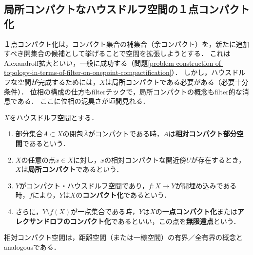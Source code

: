 \documentclass[uplatex,dvipdfmx]{jsreport}
\begin{document}
\subsection{局所コンパクトなハウスドルフ空間の１点コンパクト化}

\begin{tcolorbox}[colframe=ForestGreen, colback=ForestGreen!10!white, breakable ,colbacktitle=ForestGreen!40!white, coltitle=black,fonttitle=\bfseries\sffamily,
    title=１点コンパクト化]
    １点コンパクト化は，コンパクト集合の補集合（余コンパクト）を，新たに追加すべき開集合の候補として挙げることで空間を拡張しようとする．
    これはAlexandroff拡大といい，一般に成功する（問題\ref{problem-construction-of-topology-in-terms-of-filter-on-onepoint-compactification}）．
    しかし，ハウスドルフな空間が完成するためには，$X$は局所コンパクトである必要がある（必要十分条件）．
    位相の構成の仕方もfilterチックで，局所コンパクトの概念もfilter的な消息である．
    ここに位相の泥臭さが垣間見れる．
\end{tcolorbox}

\begin{definition}
    $X$をハウスドルフ空間とする．
    \begin{enumerate}
        \item 部分集合$A\subset X$の閉包$\overline{A}$がコンパクトである時，$A$は\textbf{相対コンパクト部分空間}であるという．
        \item $X$の任意の点$x\in X$に対し，$x$の相対コンパクトな開近傍$U$が存在するとき，$X$は\textbf{局所コンパクト}であるという．
        \item $Y$がコンパクト・ハウスドルフ空間であり，$f:X\to Y$が開埋め込みである時，$f$により，$Y$は$X$の\textbf{コンパクト化}であるという．
        \item さらに，$Y\setminus f(X)$が一点集合である時，$Y$は$X$の\textbf{一点コンパクト化}または\textbf{アレクサンドロフのコンパクト化}であるといい，この点を\textbf{無限遠点}という．
    \end{enumerate}
\end{definition}
\begin{remarks}
    相対コンパクト空間は，距離空間（または一様空間）の有界／全有界の概念とanalogousである．
\end{remarks}
\end{document}
